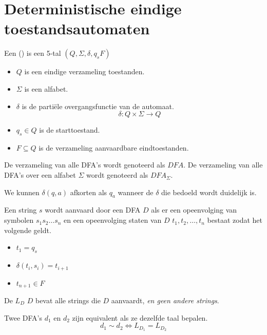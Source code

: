 \documentclass[main.tex]{subfiles}
\begin{document}
\section{Deterministische eindige toestandsautomaten}
\begin{de}
  Een  () is een 5-tal $(Q,\Sigma,\delta,q_{s}F)$
  \begin{itemize}
  \item $Q$ is een eindige verzameling toestanden.
  \item $\Sigma$ is een alfabet.
  \item $\delta$ is de parti\"ele overgangsfunctie van de automaat.
  \[ \delta: Q \times \Sigma \rightarrow Q \]
  \item $q_{s} \in Q$ is de starttoestand.
  \item $F \subseteq Q$ is de verzameling aanvaardbare eindtoestanden.
  \end{itemize}
\end{de}

\begin{de}
  De verzameling van alle DFA's wordt genoteerd als $DFA$.
  De verzameling van alle DFA's over een alfabet $\Sigma$ wordt genoteerd als $DFA_{\Sigma}$.
\end{de}

\begin{de}
  We kunnen $\delta(q,a)$ afkorten als $q_{a}$ wanneer de $\delta$ die bedoeld wordt duidelijk is.  
\end{de}

\begin{de}
  Een string $s$ wordt aanvaard door een DFA $D$ als er een opeenvolging van symbolen $s_{1}s_{2}\dotsc s_{n}$ en een opeenvolging staten van $D$ $t_{1},t_{2},\dotsc,t_{n}$ bestaat zodat het volgende geldt.
  \begin{itemize}
  \item $t_{1} = q_{s}$
  \item $\delta(t_{i},s_{i}) = t_{i+1}$
  \item $t_{n+1} \in F$
  \end{itemize}
\end{de}

\begin{de}
  De  $L_{D}$  $D$ bevat alle strings die $D$ aanvaardt, \textit{en geen andere strings}.
\end{de}

\begin{de}
  Twee DFA's $d_{1}$ en $d_{2}$ zijn equivalent als ze dezelfde taal bepalen.
  \[ d_{1} \sim d_{2} \Leftrightarrow L_{D_{1}} = L_{D_{2}} \]
\end{de}
\end{document}
